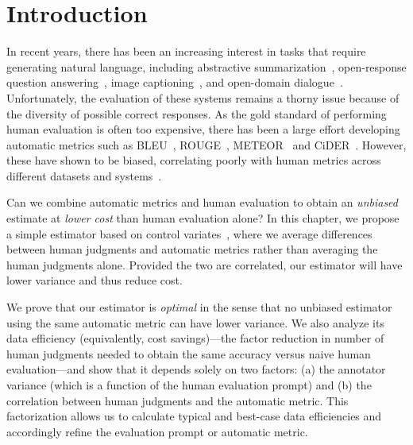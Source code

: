 \section{\label{sec:intro}Introduction}

In recent years, there has been an increasing interest in tasks that require generating natural language, including
  abstractive summarization~\citep{nallapati2016abstractive},
  open-response question answering~\citep{nguyen2016ms,kovcisky2017narrativeqa}, 
  image captioning~\citep{lin2014microsoft},
  and open-domain dialogue~\citep{lowe2017ubuntu}.
Unfortunately, the evaluation of these systems remains a thorny issue because of the diversity of possible correct responses.
As the gold standard of performing human evaluation is often too expensive,
there has been a large effort developing
automatic metrics such as BLEU~\citep{papineni02bleu}, ROUGE~\citep{lin2004rouge}, METEOR~\citep{lavie2009meteor,denkowski2014meteor} and CiDER~\citep{vedantam2015cider}.
However, these have shown to be biased, correlating poorly with human metrics across different datasets and systems~\citep{liu2016evaluate,novikova2017why}.

Can we combine automatic metrics and human evaluation to obtain
an \emph{unbiased} estimate at \emph{lower cost} than human evaluation alone?
In this chapter,
we propose a simple estimator based on control variates~\citep{ripley2009stochastic},
where we average differences between human judgments and automatic metrics
rather than averaging the human judgments alone.
Provided the two are correlated,
our estimator will have lower variance and thus reduce cost.

We prove that our estimator is \emph{optimal} in the sense
that no unbiased estimator using the same automatic metric can have lower variance.
We also analyze its data efficiency (equivalently, cost savings)---the factor reduction in number of human judgments needed to obtain the same accuracy versus naive human evaluation---and show that it depends solely on
two factors:
  (a) the annotator variance (which is a function of the human evaluation prompt) and
  (b) the correlation between human judgments and the automatic metric.
This factorization allows us to calculate typical and best-case data efficiencies and accordingly refine the evaluation prompt or automatic metric.

